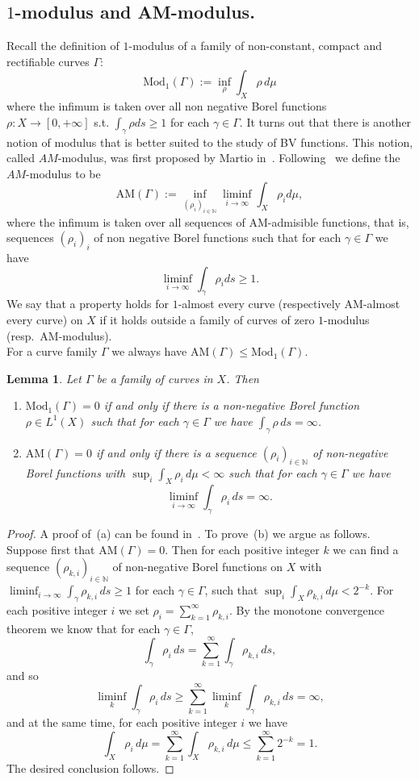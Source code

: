 \documentclass[11pt, letterpaper]{amsart} %
\newcommand*{\N}{{\mathbb N}}
\newcommand*{\Mod}{\text{Mod}_1}
\newcommand*{\AM}{\text{AM}}
\numberwithin{equation}{section}
\theoremstyle{plain}
\newtheorem{lemma}[equation]{Lemma}
\theoremstyle{definition}
\begin{document}
{\subsection{$1$-modulus and AM-modulus.}
Recall the definition of $1$-modulus of a family of non-constant, compact and rectifiable curves $\Gamma$:
\[
\Mod(\Gamma ):=\inf_\rho \int_X \rho\, d\mu 
\]
where the infimum is taken over all non negative Borel functions $\rho :X\to [0,+\infty ]$ s.t. $\int_\gamma \rho ds\geq 1$ for 
each $\gamma\in\Gamma$. It turns out that there is another notion of modulus that is better suited to the study of
BV functions. This notion, called $AM$-modulus, was first proposed by Martio in~\cite{Martio}.
Following~\cite{Martio} we define the $AM$-modulus to be
\[
\mathrm{AM}(\Gamma ):=\inf_{(\rho _i)_{i\in\N}}\liminf_{i\to\infty}\int_X\rho_id\mu,
\]
where the infimum is taken over all sequences of $\mathrm{AM}$-admisible functions, that is, sequences $(\rho _i)_i$ of non negative Borel functions such that for each $\gamma\in \Gamma$ we have
\[
\liminf_{i\to\infty }\int_\gamma \rho_i ds\geq 1.
\]
We say that a property holds for $1$-almost every curve (respectively AM-almost every curve) on $X$ if it holds outside a family of curves of zero $1$-modulus (resp.\ AM-modulus).\\
For a curve family $\Gamma $ we always have $\mathrm{AM}(\Gamma )\leq \mathrm{Mod}_1(\Gamma )$.

\begin{lemma}\label{lem:KosMac}
Let $\Gamma$ be a family of curves in $X$. Then 
\begin{enumerate}
\item[(a)] $\Mod(\Gamma)=0$ if and only if there is a non-negative Borel function $\rho\in L^1(X)$ such that for each
$\gamma\in\Gamma$ we have $\int_\gamma\rho\, ds=\infty$.
\item[(b)] $\AM(\Gamma)=0$ if and only if there is a sequence $(\rho_i)_{i\in\N}$ of non-negative Borel functions with 
$\sup_i\int_X\rho_i\, d\mu<\infty$ such that for each $\gamma\in\Gamma$ we have
\[
\liminf_{i\to\infty}\int_\gamma\rho_i\, ds=\infty.
\]
\end{enumerate}
\end{lemma}

\begin{proof}
A proof of~(a) can be found in~\cite[Lemma~5.2.8]{HKSTbook}. To prove~(b) we argue as follows. Suppose first that
$\AM(\Gamma)=0$. Then for each positive integer $k$ we can find a sequence $(\rho_{k,i})_{i\in\N}$ of non-negative
Borel functions on $X$ with $\liminf_{i\to\infty}\int_\gamma\rho_{k,i}\, ds\ge 1$ for each $\gamma\in\Gamma$, such that
$\sup_i\int_X\rho_{k,i}\, d\mu<2^{-k}$. For each positive integer $i$ we set $\rho_i=\sum_{k=1}^\infty\rho_{k,i}$.
By the monotone convergence theorem we know that for each $\gamma\in \Gamma$,
\[
\int_\gamma\rho_i\, ds=\sum_{k=1}^\infty\int_\gamma\rho_{k,i}\, ds,
\]
and so
\[
\liminf_k\int_\gamma\rho_i\, ds\ge \sum_{k=1}^\infty\liminf_k\int_\gamma\rho_{k,i}\, ds=\infty,
\]
and at the same time, for each positive integer $i$ we have
\[
\int_X\rho_i\, d\mu=\sum_{k=1}^\infty\int_X\rho_{k,i}\, d\mu\le \sum_{k=1}^\infty 2^{-k}=1.
\]
The desired conclusion follows.


\end{proof}}
\end{document}
